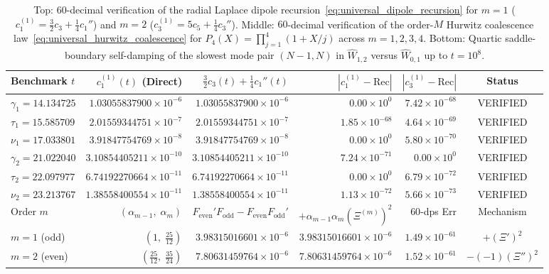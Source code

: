 \documentclass[11pt,reqno]{amsart}
\theoremstyle{definition}
\theoremstyle{remark}
\numberwithin{equation}{section}
\begin{document}
\begin{table}[t]
\centering
\caption{Top: $60$-decimal verification of the radial Laplace dipole recursion~\eqref{eq:universal_dipole_recursion} for $m = 1$ ($c_1^{(1)} = \frac{3}{2}c_3 + \frac{1}{4}c_1''$) and $m = 2$ ($c_3^{(1)} = 5c_5 + \frac{1}{4}c_3''$). Middle: $60$-decimal verification of the order-$M$ Hurwitz coalescence law~\eqref{eq:universal_hurwitz_coalescence} for $P_4(X) = \prod_{j=1}^4 (1 + X/j)$ across $m = 1, 2, 3, 4$. Bottom: Quartic saddle-boundary self-damping of the slowest mode pair $(N-1, N)$ in $\widehat{W}_{1,2}$ versus $\widehat{W}_{0,1}$ up to $t = 10^8$.}\label{tab:laplace_hurwitz_boundary}
\scriptsize
\setlength{\tabcolsep}{3.0pt}
\begin{tabular}{@{}lrrrrc@{}}
\toprule
Benchmark $t$ & $c_1^{(1)}(t)$ (Direct) & $\frac{3}{2}c_3(t) + \frac{1}{4}c_1''(t)$ & $|c_1^{(1)} - \text{Rec}|$ & $|c_3^{(1)} - \text{Rec}|$ & Status \\
\midrule
$\gamma_1 = 14.134725$ & $1.03055837900\times 10^{-6}$  & $1.03055837900\times 10^{-6}$  & $0.00\times 10^{0}$   & $7.42\times 10^{-68}$ & VERIFIED \\
$\tau_1 = 15.585709$   & $2.01559344751\times 10^{-7}$  & $2.01559344751\times 10^{-7}$  & $1.85\times 10^{-68}$ & $4.64\times 10^{-69}$ & VERIFIED \\
$\nu_1 = 17.033801$    & $3.91847754769\times 10^{-8}$  & $3.91847754769\times 10^{-8}$  & $0.00\times 10^{0}$   & $5.80\times 10^{-70}$ & VERIFIED \\
$\gamma_2 = 21.022040$ & $3.10854405211\times 10^{-10}$ & $3.10854405211\times 10^{-10}$ & $7.24\times 10^{-71}$ & $0.00\times 10^{0}$   & VERIFIED \\
$\tau_2 = 22.097977$   & $6.74192270664\times 10^{-11}$ & $6.74192270664\times 10^{-11}$ & $0.00\times 10^{0}$   & $6.79\times 10^{-72}$ & VERIFIED \\
$\nu_2 = 23.213767$    & $1.38558400554\times 10^{-11}$ & $1.38558400554\times 10^{-11}$ & $1.13\times 10^{-72}$ & $5.66\times 10^{-73}$ & VERIFIED \\
\midrule
Order $m$ & $(\alpha_{m-1},\; \alpha_m)$ & $F_{\mathrm{even}}'F_{\mathrm{odd}} - F_{\mathrm{even}}F_{\mathrm{odd}}'$ & $+\alpha_{m-1}\alpha_m(\Xi^{(m)})^2$ & $60$-dps Err & Mechanism \\
\midrule
$m = 1$ (odd)  & $(1,\; \tfrac{25}{12})$       & $3.98315016601\times 10^{-6}$ & $3.98315016601\times 10^{-6}$ & $1.49\times 10^{-61}$ & $+(\Xi')^2$ \\
$m = 2$ (even) & $(\tfrac{25}{12},\; \tfrac{35}{24})$ & $7.80631459764\times 10^{-6}$ & $7.80631459764\times 10^{-6}$ & $1.52\times 10^{-61}$ & $-(-1)(\Xi'')^2$ \\

\end{tabular}
\end{table}
\end{document}
